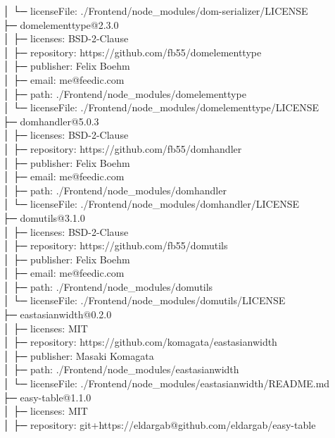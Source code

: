 \documentclass[
    paper=a4,
    twoside=false,
    parskip=half,
    listof=entryprefix,
    listof=totoc,
    index=totoc,
    bibliography=totoc,
    headsepline,
]{scrbook}
\begin{document}
    │  └─ licenseFile: ./Frontend/node\_modules/dom-serializer/LICENSE\\
    ├─ domelementtype@2.3.0\\
    │  ├─ licenses: BSD-2-Clause\\
    │  ├─ repository: https://github.com/fb55/domelementtype\\
    │  ├─ publisher: Felix Boehm\\
    │  ├─ email: me@feedic.com\\
    │  ├─ path: ./Frontend/node\_modules/domelementtype\\
    │  └─ licenseFile: ./Frontend/node\_modules/domelementtype/LICENSE\\
    ├─ domhandler@5.0.3\\
    │  ├─ licenses: BSD-2-Clause\\
    │  ├─ repository: https://github.com/fb55/domhandler\\
    │  ├─ publisher: Felix Boehm\\
    │  ├─ email: me@feedic.com\\
    │  ├─ path: ./Frontend/node\_modules/domhandler\\
    │  └─ licenseFile: ./Frontend/node\_modules/domhandler/LICENSE\\
    ├─ domutils@3.1.0\\
    │  ├─ licenses: BSD-2-Clause\\
    │  ├─ repository: https://github.com/fb55/domutils\\
    │  ├─ publisher: Felix Boehm\\
    │  ├─ email: me@feedic.com\\
    │  ├─ path: ./Frontend/node\_modules/domutils\\
    │  └─ licenseFile: ./Frontend/node\_modules/domutils/LICENSE\\
    ├─ eastasianwidth@0.2.0\\
    │  ├─ licenses: MIT\\
    │  ├─ repository: https://github.com/komagata/eastasianwidth\\
    │  ├─ publisher: Masaki Komagata\\
    │  ├─ path: ./Frontend/node\_modules/eastasianwidth\\
    │  └─ licenseFile: ./Frontend/node\_modules/eastasianwidth/README.md\\
    ├─ easy-table@1.1.0\\
    │  ├─ licenses: MIT\\
    │  ├─ repository: git+https://eldargab@github.com/eldargab/easy-table\\
\end{document}
